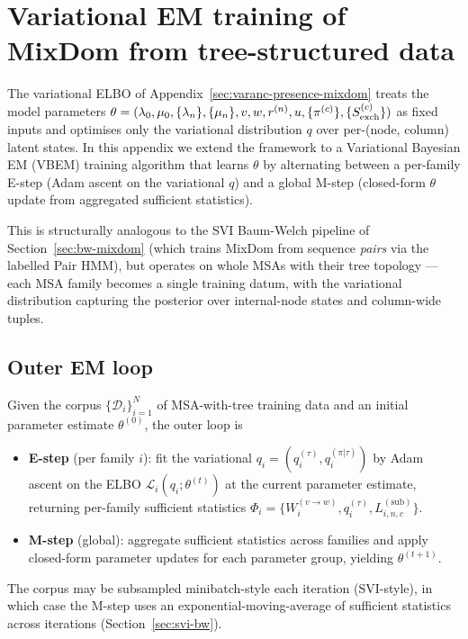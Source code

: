 
\section{Variational EM training of MixDom from tree-structured data}
\label{sec:varanc-vbem}

The variational ELBO of Appendix~\ref{sec:varanc-presence-mixdom}
treats the model parameters $\theta = (\lambda_0, \mu_0,
\{\lambda_n\}, \{\mu_n\}, v, w, r^{(n)},
u, \{\pi^{(c)}\}, \{S^{(c)}_{\mathrm{exch}}\})$ as fixed inputs and optimises only the
variational distribution $q$ over per-(node, column) latent states. In
this appendix we extend the framework to a Variational Bayesian EM
(VBEM) training algorithm that learns $\theta$ by alternating between
a per-family E-step (Adam ascent on the variational $q$) and a global
M-step (closed-form $\theta$ update from aggregated sufficient statistics).

This is structurally analogous to the SVI Baum-Welch pipeline of
Section~\ref{sec:bw-mixdom} (which trains MixDom from sequence
\emph{pairs} via the labelled Pair HMM), but operates on whole MSAs
with their tree topology --- each MSA family becomes a single
training datum, with the variational distribution capturing the
posterior over internal-node states and column-wide tuples.

\subsection{Outer EM loop}
\label{sec:vbem-outer}

Given the corpus $\{\mathcal{D}_i\}_{i=1}^N$ of MSA-with-tree
training data and an initial parameter estimate $\theta^{(0)}$, the
outer loop is
\begin{itemize}[nosep]
\item \textbf{E-step} (per family $i$): fit the variational
$q_i = (q_i^{(\tau)}, q_i^{(\pi|\tau)})$ by Adam ascent on the
ELBO $\mathcal{L}_i(q_i; \theta^{(t)})$ at the current parameter
estimate, returning per-family sufficient statistics
$\Phi_i = \{W^{(v\to w)}_i, q^{(\tau)}_i, L^{(\mathrm{sub})}_{i,n,c}\}$.
\item \textbf{M-step} (global): aggregate sufficient statistics
across families and apply closed-form parameter updates for each
parameter group, yielding $\theta^{(t+1)}$.
\end{itemize}
The corpus may be subsampled minibatch-style each iteration
(SVI-style), in which case the M-step uses an exponential-moving-average
of sufficient statistics across iterations
(Section~\ref{sec:svi-bw}).

